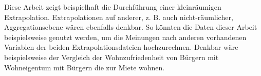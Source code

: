 \documentclass{Vorlage}
\begin{document}
Diese Arbeit zeigt beispielhaft die Durchführung einer kleinräumigen Extrapolation. Extrapolationen auf anderer, z. B. auch nicht-räumlicher, Aggregationsebene wären ebenfalls denkbar. So könnten die Daten dieser Arbeit beispielsweise genutzt werden, um die Meinungen nach anderen vorhandenen Variablen der beiden Extrapolationsdateien hochzurechnen. Denkbar wäre beispielsweise der Vergleich der Wohnzufriedenheit von Bürgern mit Wohneigentum mit Bürgern die zur Miete wohnen.
\clearpage



 





\clearpage

\end{document}
